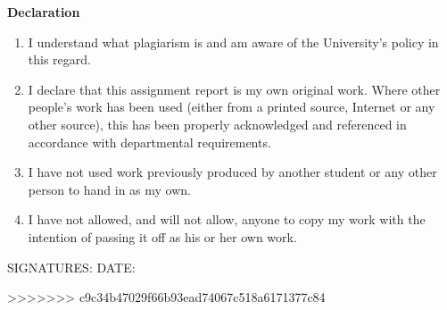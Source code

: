 {\textbf{Declaration}
\begin{enumerate}
\item I understand what plagiarism is and am aware of the University's
  policy in this regard.
\item I declare that this assignment report is my own original work.
  Where other people's work has been used (either from a printed source,
  Internet or any other source), this has been properly acknowledged and
  referenced in accordance with departmental requirements.
\item I have not used work previously produced by another student or any
  other person to hand in as my own.
\item I have not allowed, and will not allow, anyone to copy my work with
  the intention of passing it off as his or her own work.
\end{enumerate}

\vspace*{1cm}

SIGNATURES: \makebox[3in]{\hrulefill} \quad DATE: \makebox[1.5in]{\hrulefill}
}

\newpage


>>>>>>> c9c34b47029f66b93ead74067c518a6171377c84
